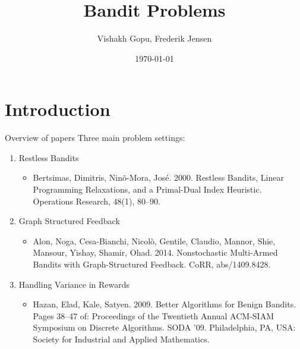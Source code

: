 \documentclass{beamer}
\title{Bandit Problems}
\date{\today}
\author{Vishakh Gopu, Frederik Jensen}
\institute{Advanced Machine Learning - Spring 2017}
\begin{document}
\maketitle


\section{Introduction}
\begin{frame}{Overview of papers}   
  Three main problem settings: 
  \begin{enumerate}
  \item
    Restless Bandits
    \begin{itemize}
    \item
      Bertsimas, Dimitris, Nin\~o-Mora, Jos\'e. 2000. Restless Bandits, Linear Programming
      Relaxations, and a Primal-Dual Index Heuristic. Operations Research, 48(1), 80–90.
    \end{itemize}
  \item
    Graph Structured Feedback
    \begin{itemize}
    \item
      Alon, Noga, Cesa-Bianchi, Nicol\`o, Gentile, Claudio, Mannor, Shie, Mansour, Yishay,
      Shamir, Ohad. 2014. Nonstochastic Multi-Armed Bandits with Graph-Structured Feedback.
      CoRR, abs/1409.8428.
    \end{itemize}
  \item
    Handling Variance in Rewards
    \begin{itemize}
    \item
      Hazan, Elad, Kale, Satyen. 2009. Better Algorithms for Benign Bandits. Pages 38–47 of: 
      Proceedings of the Twentieth Annual ACM-SIAM Symposium on Discrete Algorithms. SODA '09.
      Philadelphia, PA, USA: Society for Industrial and Applied Mathematics.
    \end{itemize}
  \end{enumerate}
\end{frame}
\end{document}
